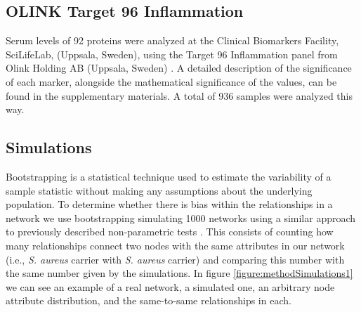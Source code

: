 \subsection{OLINK Target 96 Inflammation }

Serum levels of 92 proteins were analyzed at the Clinical Biomarkers Facility, SciLifeLab, (Uppsala, Sweden), using the Target 96 Inflammation panel from Olink Holding AB (Uppsala, Sweden) \cite{olinkWeb}. A detailed description of the significance of each marker, alongside the mathematical significance of the values, can be found in the supplementary materials. A total of 936 samples were analyzed this way.

\subsection{Simulations}

\label{sec:MetodologySimulations}


Bootstrapping is a statistical technique used to estimate the variability of a sample statistic without making any assumptions about the underlying population. To determine whether there is bias within the relationships in a network we use bootstrapping simulating 1000 networks using a similar approach to previously described non-parametric tests \cite{ref:nonparametricBook}. This consists of counting how many relationships connect two nodes with the same attributes in our network (i.e., \textit{S. aureus} carrier with \textit{S. aureus} carrier) and comparing this number with the same number given by the simulations. In figure \ref{figure:methodSimulations1} we can see an example of a real network, a simulated one, an arbitrary node attribute distribution, and the same-to-same relationships in each.

